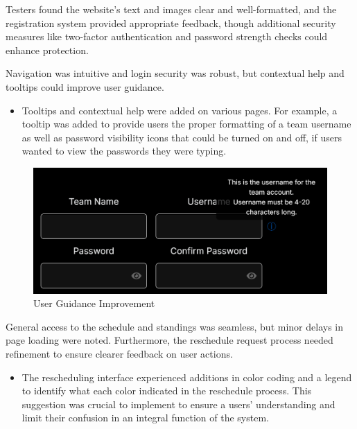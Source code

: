 \documentclass{article}
\begin{document}
    Testers found the website's text and images clear and
    well-formatted, and the registration system provided appropriate feedback,
    though additional security measures like two-factor authentication and
    password strength checks could enhance protection.
    
    Navigation was intuitive and login security was robust,
    but contextual help and tooltips could improve user guidance.
    \begin{itemize}
        \item Tooltips and contextual help were added on various pages. For
        example, a tooltip was added to provide users the proper formatting of
        a team username as well as password visibility icons that could be turned
        on and off, if users wanted to view the passwords they were typing.
    \end{itemize}

    \begin{figure}[H]
    \centering
    \includegraphics[scale=0.6]{tooltip_password_visibility.png}
    \caption{User Guidance Improvement}
    \label{guide}
    \end{figure}
    
    General access
    to the schedule and standings was seamless, but minor delays in page loading
    were noted. Furthermore, the reschedule request process
    needed refinement to ensure clearer feedback on user actions.

    \begin{itemize}
        \item The rescheduling interface experienced additions in color coding and
        a legend to identify what each color indicated in the reschedule process.
        This suggestion was crucial to implement to ensure a users' understanding
        and limit their confusion in an integral function of the system.
    \end{itemize}
\end{document}
